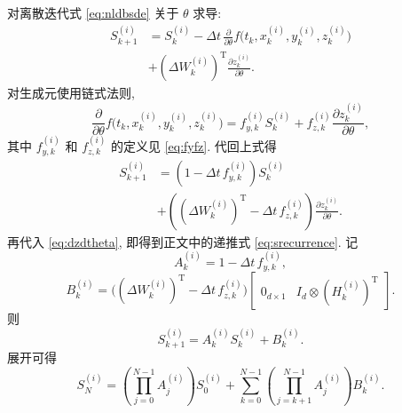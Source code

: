     对离散迭代式 \eqref{eq:nldbsde} 关于 $\theta$ 求导:
    \begin{equation*}
      \begin{aligned}
        S_{k + 1}^{(i)}
        &= S_{k}^{(i)}
        - \Delta t\,
        \frac{\partial}{\partial \theta}
        f\!\big( t_{k}, x_{k}^{(i)}, y_{k}^{(i)}, z_{k}^{(i)} \big) \\
        &+ (\Delta W_{k}^{(i)})^{\operatorname{T}}
        \frac{\partial z_{k}^{(i)}}{\partial \theta}.
      \end{aligned}
    \end{equation*}
    对生成元使用链式法则,
    \begin{equation*}
      \frac{\partial}{\partial \theta}
      f\!\big( t_{k}, x_{k}^{(i)}, y_{k}^{(i)}, z_{k}^{(i)} \big)
      = f_{y,k}^{(i)} S_{k}^{(i)}
      + f_{z,k}^{(i)}
      \frac{\partial z_{k}^{(i)}}{\partial \theta},
    \end{equation*}
    其中 $f_{y, k}^{(i)}$ 和 $f_{z, k}^{(i)}$ 的定义见 \eqref{eq:fyfz}.
    代回上式得
    \begin{equation}
      \begin{aligned}
        S_{k + 1}^{(i)}
        &= \left(1 - \Delta t\, f_{y, k}^{(i)}\right) S_{k}^{(i)} \\
        &+ \left(
          (\Delta W_{k}^{(i)})^{\operatorname{T}}
          - \Delta t\, f_{z, k}^{(i)}
        \right)
        \frac{\partial z_{k}^{(i)}}{\partial \theta}.
      \end{aligned}
      \label{eq:Skn4Sk}
    \end{equation}
    再代入 \eqref{eq:dzdtheta}, 即得到正文中的递推式 \eqref{eq:srecurrence}.
    记
    \begin{equation}
      A_{k}^{(i)} = 1 - \Delta t\, f_{y,k}^{(i)},
      \label{eq:Ak}
    \end{equation}
    \begin{equation}
      B_{k}^{(i)} =
      \big( (\Delta W_{k}^{(i)})^{\operatorname{T}} - \Delta t\, f_{z,k}^{(i)} \big)
      \begin{bmatrix}
        0_{d \times 1} & I_{d} \otimes (H_{k}^{(i)})^{\operatorname{T}}
      \end{bmatrix}.
      \label{eq:Bk}
    \end{equation}
    则
    \begin{equation}
      S_{k+1}^{(i)} = A_{k}^{(i)} S_{k}^{(i)} + B_{k}^{(i)}.
      \label{eq:sab}
    \end{equation}
    展开可得
    \begin{equation}
      S_{N}^{(i)} = (\prod_{j = 0}^{N - 1} A_{j}^{(i)}) S_{0}^{(i)} +
      \sum_{k=0}^{N-1} ( \prod_{j =k + 1}^{N - 1} A_j^{(i)}) B_{k}^{(i)}.
      \label{eq:sni}
    \end{equation}

